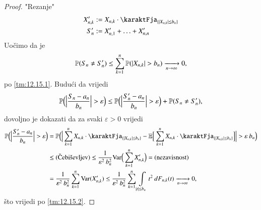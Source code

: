 \begin{proof}
    "Rezanje"
    \begin{equation*}
        \begin{aligned}
            X_{n, k}' &:= X_{n, k} \cdot \karaktFja_{\{ |X_{n, k}| \leq b_n \}}\\
            S_n' & := X_{n, 1}' + \ldots + X_{n, n}' 
        \end{aligned}
    \end{equation*}
    Uo\v cimo da je
    \begin{equation*}
        \mathbb{P}({S_n \neq S_n'}) \leq \sum\limits_{k = 1}^{n} \mathbb{P}({| X_{n, k} | > b_n}) \xrightarrow[n \to \infty]{} 0,
    \end{equation*}
    po \ref{tm:12.15.1}.
    Budu\' ci da vrijedi
    \begin{equation*}
        \mathbb{P} \Big( \Big| \frac{S_n - a_n}{b_n} \Big| > \varepsilon \Big) \leq \mathbb{P} \Big( \Big| \frac{S_n' - a_n}{b_n} \Big| > \varepsilon \Big) + \mathbb{P}({S_n \neq S_n'}),
    \end{equation*}
    dovoljno je dokazati da za svaki $\varepsilon > 0$ vrijedi
    \begin{equation*}
        \begin{aligned}
            \masP \Big( \Big| \frac{S_n' - a_n}{b_n} \Big| > \varepsilon \Big) &= \masP \Big( \Big| \suma{k = 1}{n} X_{n, k} \cdot \karaktFja_{\{ |X_{n, k}| \leq b_n \}} - \masE \Big[ \suma{k = 1}{n} X_{n, k} \cdot \karaktFja_{\{ |X_{n, k}| \leq b_n \}} \Big] \Big| > \varepsilon \: b_n \Big)\\
            &\leq (\textnormal{\v Cebi\v sevljev}) \leq \frac{1}{\varepsilon^2 \: b_n^2} \Var \Big( \suma{k = 1}{n} X_{n, k}' \Big) = (\textnormal{nezavisnost})\\
            &= \frac{1}{\varepsilon^2 \: b_n^2} \suma{k = 1}{n} \Var (X_{n, k}') \leq \frac{1}{\varepsilon^2 \: b_n^2} \suma{k = 1}{n} \int\limits_{|t| \leq b_n} t^2 \: dF_{n, k} (t) \xrightarrow[n \to \infty]{} 0,
        \end{aligned}
    \end{equation*}
    \v sto vrijedi po \ref{tm:12.15.2}.
\end{proof}